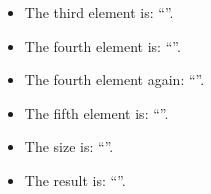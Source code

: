 \documentclass{article}
\newcommand{\fourthelement}{\getnthelement{4}}
\begin{document}

\begin{itemize}
\item The third element is: ``''.
\item The fourth element is: ``\fourthelement''.
\item The fourth element again: ``\fourthelement''.
\item The fifth element is: ``''.
\item The size is: ``\getsizelist''.    
\item The result is: ``''. 
\end{itemize}


\texttt{\meaning\playaroundelement}
\end{document}
